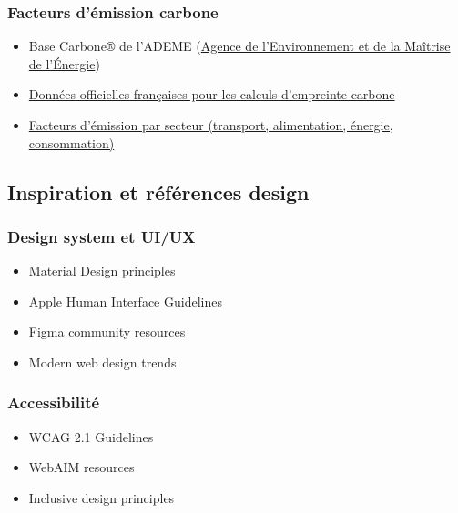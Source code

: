 \documentclass[a4paper,11pt]{article}
\begin{document}
        \subsubsection{Facteurs d'émission carbone}
            \begin{itemize}
                \item Base Carbone® de l'ADEME (\href{https://www.ademe.fr}{Agence de l'Environnement et de la Maîtrise de l'Énergie})
                \item \href{https://www.statistiques.developpement-durable.gouv.fr/lempreinte-carbone-de-la-france-de-1990-2023?rubrique=&dossier=1286}{Données officielles françaises pour les calculs d'empreinte carbone}
                \item \href{https://www.notre-environnement.gouv.fr/themes/climat/les-emissions-de-gaz-a-effet-de-serre-et-l-empreinte-carbone-ressources/article/les-emissions-de-gaz-a-effet-de-serre-du-secteur-des-transports}{Facteurs d'émission par secteur (transport, alimentation, énergie, consommation)}
            \end{itemize}

    \subsection{Inspiration et références design}

        \subsubsection{Design system et UI/UX}
            \begin{itemize}
                \item Material Design principles
                \item Apple Human Interface Guidelines
                \item Figma community resources
                \item Modern web design trends
            \end{itemize}

        \subsubsection{Accessibilité}
            \begin{itemize}
                \item WCAG 2.1 Guidelines
                \item WebAIM resources
                \item Inclusive design principles
            \end{itemize}
\end{document}
